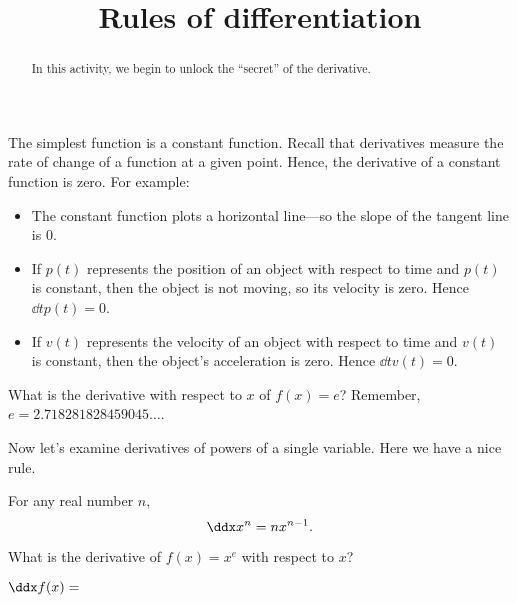 \documentclass{ximera}
\title{Rules of differentiation}
\begin{document}
\begin{abstract}
  In this activity, we begin to unlock the ``secret'' of the derivative. 
\end{abstract}
\maketitle


The simplest function is a constant function.  Recall that derivatives
measure the rate of change of a function at a given point. Hence, the
derivative of a constant function is zero. For example:
\begin{itemize}
\item The constant function plots a horizontal line---so the slope of
  the tangent line is $0$.
\item If $p(t)$ represents the position of an object with respect to
  time and $p(t)$ is constant, then the object is not moving, so its
  velocity is zero. Hence $\dd{t} p(t) = 0$.
\item If $v(t)$ represents the velocity of an object with respect to
  time and $v(t)$ is constant, then the object's acceleration is
  zero. Hence $\dd{t} v(t) = 0$.
\end{itemize}


\begin{question}
  What is the derivative with respect to $x$ of $f(x) = e$? Remember,
  $e=2.718281828459045\dots$.
    \begin{multipleChoice}
    \end{multipleChoice}  
\end{question}

Now let's examine derivatives of powers of a single variable.  Here we
have a nice rule.

\begin{theorem}
For any real number $n$, 
\[
\ddx x^n = n x^{n-1}.
\]
\end{theorem}

\begin{question}
  What is the derivative of $f(x) = x^e$ with respect to $x$?
\begin{prompt}
$\ddx f(x) = $
\end{prompt}
\end{question}
\end{document}
